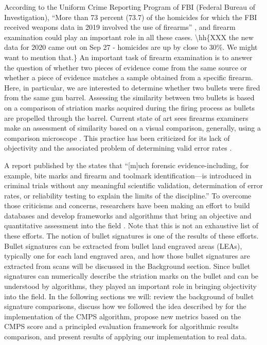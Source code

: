 According to the Uniform Crime Reporting Program of FBI (Federal Bureau
of Investigation), ``More than 73 percent (73.7) of the homicides for
which the FBI received weapons data in 2019 involved the use of
firearms'' \citep{fbiucr}, and firearm examination could play an
important role in all these cases. \textbackslash hh\{XXX the new data
for 2020 came out on Sep 27 - homicides are up by close to 30\%. We
might want to mention that.\} An important task of firearm examination
is to answer the question of whether two pieces of evidence come from
the same source or whether a piece of evidence matches a sample obtained
from a specific firearm. Here, in particular, we are interested to
determine whether two bullets were fired from the same gun barrel.
Assessing the similarity between two bullets is based on a comparison of
striation marks acquired during the firing process as bullets are
propelled through the barrel. Current state of art sees firearms
examiners make an assessment of similarity based on a visual comparison,
generally, using a comparison microscope \citep{afte}. This practice has
been criticized for its lack of objectivity and the associated problem
of determining valid error rates \citep{pcast}.

A report published by the \citet{nrc} states that ``{[}m{]}uch forensic
evidence-including, for example, bite marks and firearm and toolmark
identification---is introduced in criminal trials without any meaningful
scientific validation, determination of error rates, or reliability
testing to explain the limits of the discipline.'' To overcome those
criticisms and concerns, researchers have been making an effort to build
databases and develop frameworks and algorithms that bring an objective
and quantitative assessment into the field
\citetext{\citealp[\citet{brundage}, \citet{hamby}, \citet{Hamby:2019},
\citet{song2005}, \citet{ChumbleyL_Scott2010VoTM}, \citet{aoas},
\citet{pmid30444940}]{nistdb}; \citealp{cmps}}. Note that this is not an
exhaustive list of these efforts. The notion of bullet signatures is one
of the results of these efforts. Bullet signatures can be extracted from
bullet land engraved areas (LEAs), typically one for each land engraved
area, and how those bullet signatures are extracted from scans will be
discussed in the Background section. Since bullet signatures can
numerically describe the striation marks on the bullet and can be
understood by algorithms, they played an important role in bringing
objectivity into the field. In the following sections we will: review
the background of bullet signature comparisons, discuss how we followed
the idea described by \citet{cmps} for the implementation of the CMPS
algorithm, propose new metrics based on the CMPS score and a principled
evaluation framework for algorithmic results comparison, and present
results of applying our implementation to real data.

